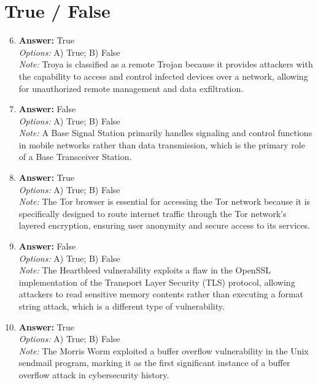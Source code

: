 \documentclass[12pt]{article}
\begin{document}
\section*{True / False}
\begin{enumerate}[label=\arabic*.]
\setcounter{enumi}{5}
\item \textbf{Answer:} True
\\ \textit{Options:} A) True; B) False
\\ \textit{Note:} Troya is classified as a remote Trojan because it provides attackers with the capability to access and control infected devices over a network, allowing for unauthorized remote management and data exfiltration.
\item \textbf{Answer:} False
\\ \textit{Options:} A) True; B) False
\\ \textit{Note:} A Base Signal Station primarily handles signaling and control functions in mobile networks rather than data transmission, which is the primary role of a Base Transceiver Station.
\item \textbf{Answer:} True
\\ \textit{Options:} A) True; B) False
\\ \textit{Note:} The Tor browser is essential for accessing the Tor network because it is specifically designed to route internet traffic through the Tor network's layered encryption, ensuring user anonymity and secure access to its services.
\item \textbf{Answer:} False
\\ \textit{Options:} A) True; B) False
\\ \textit{Note:} The Heartbleed vulnerability exploits a flaw in the OpenSSL implementation of the Transport Layer Security (TLS) protocol, allowing attackers to read sensitive memory contents rather than executing a format string attack, which is a different type of vulnerability.
\item \textbf{Answer:} True
\\ \textit{Options:} A) True; B) False
\\ \textit{Note:} The Morris Worm exploited a buffer overflow vulnerability in the Unix sendmail program, marking it as the first significant instance of a buffer overflow attack in cybersecurity history.
\end{enumerate}
\end{document}

